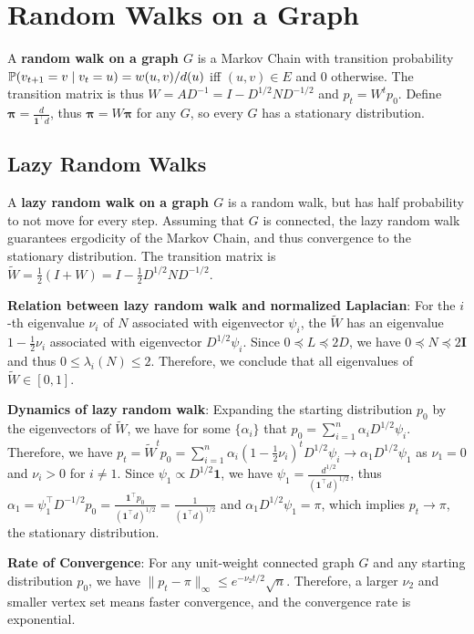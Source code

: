 \section{Random Walks on a Graph}

A \textbf{random walk on a graph $G$} is a Markov Chain with transition probability $\mathbb{P}(v_{t+1}=v \mid v_t=u)= w(u,v)/d(u)$ iff $(u,v)\in E$ and 0 otherwise. The transition matrix is thus $W=AD^{-1} = I - D^{1/2} N D^{-1/2}$ and $p_t = W^t p_0$. Define $\boldsymbol{\pi}=\frac{d}{\boldsymbol{1}^\top d}$, thus $\boldsymbol{\pi} = W \boldsymbol{\pi}$ for any $G$, so every $G$ has a stationary distribution.

\subsection{Lazy Random Walks}

A \textbf{lazy random walk on a graph $G$} is a random walk, but has half probability to not move for every step. Assuming that $G$ is connected, the lazy random walk guarantees ergodicity of the Markov Chain, and thus convergence to the stationary distribution. The transition matrix is $\tilde{W} = \frac{1}{2}(I+W) = I - \frac{1}{2} D^{1/2} N D^{-1/2}$.

\textbf{Relation between lazy random walk and normalized Laplacian}: For the $i$-th eigenvalue $\nu_i$ of $N$ associated with eigenvector $\psi_i$, the $\tilde{W}$ has an eigenvalue $1-\frac{1}{2}\nu_i$ associated with eigenvector $D^{1/2}\psi_i$. Since $0 \preceq L \preceq 2D$, we have $0 \preceq N \preceq 2\boldsymbol{I}$ and thus $0\le \lambda_i(N) \le 2$. Therefore, we conclude that all eigenvalues of $\tilde{W} \in [0,1]$.

\textbf{Dynamics of lazy random walk}: Expanding the starting distribution $p_0$ by the eigenvectors of $\tilde{W}$, we have for some $\{\alpha_i\}$ that $p_0 = \sum_{i=1}^n \alpha_i D^{1/2} \psi_i$. Therefore, we have $p_t = \tilde{W}^t p_0 = \sum_{i=1}^n \alpha_i (1-\frac{1}{2}\nu_i)^t D^{1/2}\psi_i \rightarrow \alpha_1 D^{1/2}\psi_1$ as $\nu_1=0$ and $\nu_i>0$ for $i\ne 1$. Since $\psi_1 \propto D^{1/2}\boldsymbol{1}$, we have $\psi_1 = \frac{d^{1/2}}{(\boldsymbol{1}^\top d)^{1/2}}$, thus $\alpha_1 = \psi_1^\top D^{-1/2} p_0 = \frac{\boldsymbol{1}^\top p_0}{(\boldsymbol{1}^\top d)^{1/2}} = \frac{1}{(\boldsymbol{1}^\top d)^{1/2}}$ and $\alpha_1 D^{1/2} \psi_1 = \pi$, which implies $p_t \rightarrow \pi$, the stationary distribution.

\textbf{Rate of Convergence}: For any unit-weight connected graph $G$ and any starting distribution $p_0$, we have $\|p_t - \pi\|_\infty \le e^{-\nu_2 t/2} \sqrt{n}$. Therefore, a larger $\nu_2$ and smaller vertex set means faster convergence, and the convergence rate is exponential.

